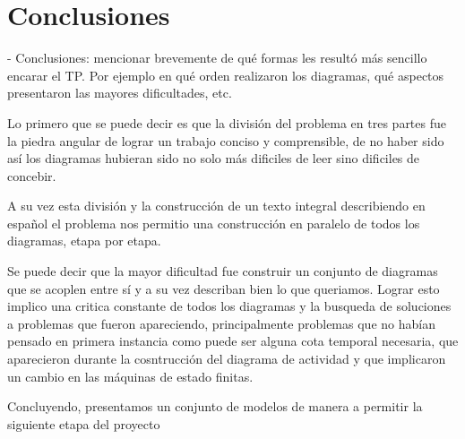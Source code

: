 \section{Conclusiones}
- Conclusiones: mencionar brevemente de qué formas les resultó más sencillo encarar el TP. Por ejemplo en qué orden realizaron los diagramas, qué aspectos presentaron las mayores dificultades, etc.

Lo primero que se puede decir es que la división del problema en tres partes fue la piedra angular de lograr un trabajo conciso y comprensible, de no haber sido así los diagramas hubieran sido no solo más dificiles de leer sino dificiles de concebir.

A su vez esta división y la construcción de un texto integral describiendo en español el problema nos permitio una construcción en paralelo de todos los diagramas, etapa por etapa. 

Se puede decir que la mayor dificultad fue construir un conjunto de diagramas que se acoplen entre sí y a su vez describan bien lo que queriamos. Lograr esto implico una critica constante de todos los diagramas y la busqueda de soluciones a problemas que fueron apareciendo, principalmente problemas que no habían pensado en primera instancia como puede ser alguna cota temporal necesaria, que aparecieron durante la cosntrucción del diagrama de actividad y que implicaron un cambio en las máquinas de estado finitas.

Concluyendo, presentamos un conjunto de modelos de manera a permitir la siguiente etapa del proyecto	